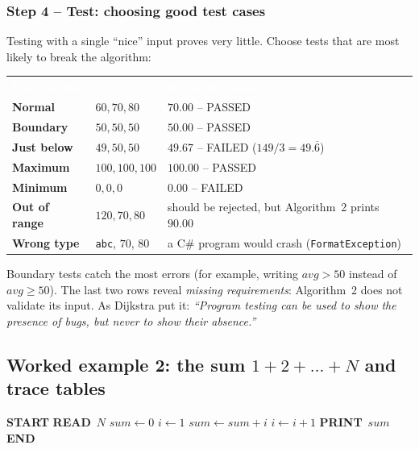 \documentclass[11pt,a4paper]{article}
\newcommand{\READ}{\textbf{READ}\ }
\newcommand{\PRINT}{\textbf{PRINT}\ }
\newcommand{\START}{\State \textbf{START}}
\newcommand{\STOP}{\State \textbf{END}}
\newcommand{\hdr}[1]{\textcolor{white}{\sffamily\bfseries #1}}
\newcommand{\hrow}{\rowcolor{ink}}
\begin{document}
\subsubsection{Step 4 -- Test: choosing good test cases}
Testing with a single ``nice'' input proves very little. Choose tests that are most likely to break the algorithm:
\begin{center}\small
\begin{tabularx}{\linewidth}{>{\bfseries}p{27mm}p{28mm}L}
\hrow \hdr{Kind of test} & \hdr{$g_1,g_2,g_3$} & \hdr{Expected result}\\
Normal & $60, 70, 80$ & $70.00$ -- PASSED\\
 Boundary & $50, 50, 50$ & $50.00$ -- PASSED\\
Just below & $49, 50, 50$ & $49.67$ -- FAILED \quad ($149/3 = 49.\overline{6}$)\\
 Maximum & $100, 100, 100$ & $100.00$ -- PASSED\\
Minimum & $0, 0, 0$ & $0.00$ -- FAILED\\
 Out of range & $120, 70, 80$ & \textcolor{errc}{should be rejected, but Algorithm~2 prints $90.00$}\\
Wrong type & \texttt{abc}, $70$, $80$ & \textcolor{errc}{a C\# program would crash (\texttt{FormatException})}\\
\end{tabularx}
\end{center}
Boundary tests catch the most errors (for example, writing $avg>50$ instead of $avg\ge50$). The last two rows reveal \emph{missing requirements}: Algorithm~2 does not validate its input. As Dijkstra put it: \emph{``Program testing can be used to show the presence of bugs, but never to show their absence.''}

\subsection{Worked example 2: the sum $1+2+\dots+N$ and trace tables}
\begin{pseudobox}
\begin{algorithmic}[1]
\START
\State \READ $N$
\State $sum \gets 0$
\State $i \gets 1$
  \State $sum \gets sum + i$
  \State $i \gets i + 1$
\EndWhileX
\State \PRINT $sum$
\STOP
\end{algorithmic}
\end{pseudobox}
\end{document}
